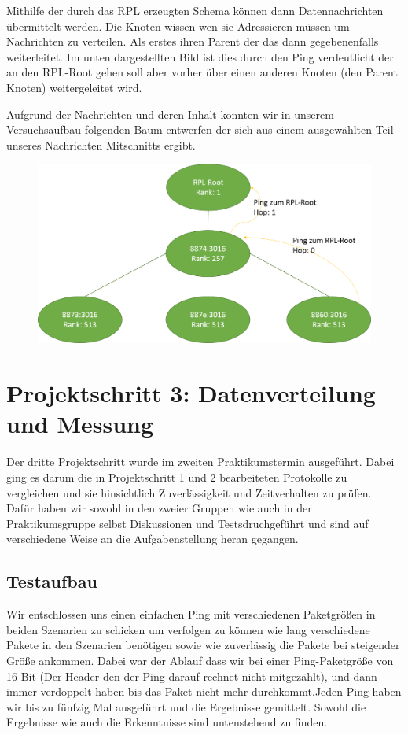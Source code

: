 \documentclass[]{scrartcl}
\begin{document}
Mithilfe der durch das RPL erzeugten Schema können dann Datennachrichten übermittelt werden. Die Knoten wissen wen sie Adressieren müssen um Nachrichten zu verteilen. Als erstes ihren Parent der das dann gegebenenfalls weiterleitet. Im unten dargestellten Bild ist dies durch den Ping verdeutlicht der an den RPL-Root gehen soll aber vorher über einen anderen Knoten (den Parent Knoten) weitergeleitet wird.

Aufgrund der Nachrichten und deren Inhalt konnten wir in unserem Versuchsaufbau folgenden Baum entwerfen der sich aus einem ausgewählten Teil unseres Nachrichten Mitschnitts ergibt.

\begin{figure}[H]
	\centering
	\includegraphics[width=1\linewidth]{RPL_Baum.png}
	\label{fig:RPL_Baum}
\end{figure}


\section{Projektschritt 3: Datenverteilung und Messung}
Der dritte Projektschritt wurde im zweiten Praktikumstermin ausgeführt. Dabei ging es darum die in Projektschritt 1 und 2 bearbeiteten Protokolle zu vergleichen und sie hinsichtlich Zuverlässigkeit und Zeitverhalten zu prüfen. Dafür haben wir sowohl in den zweier Gruppen wie auch in der Praktikumsgruppe selbst Diskussionen und Testsdruchgeführt und sind auf verschiedene Weise an die Aufgabenstellung heran gegangen.

\subsection{Testaufbau}
Wir entschlossen uns einen einfachen Ping mit verschiedenen Paketgrößen in beiden Szenarien zu schicken um verfolgen zu können wie lang verschiedene Pakete in den Szenarien benötigen sowie wie zuverlässig die Pakete bei steigender Größe ankommen.
Dabei war der Ablauf dass wir bei einer Ping-Paketgröße von 16 Bit (Der Header den der Ping darauf rechnet nicht mitgezählt), und dann immer verdoppelt haben bis das Paket nicht mehr durchkommt.Jeden Ping haben wir bis zu fünfzig Mal ausgeführt und die Ergebnisse gemittelt. Sowohl die Ergebnisse wie auch die Erkenntnisse sind untenstehend zu finden.
\end{document}
